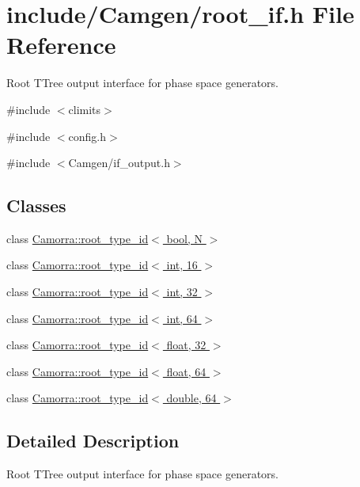 \hypertarget{a00592}{
\section{include/Camgen/root\_\-if.h File Reference}
\label{a00592}
}


Root TTree output interface for phase space generators.  


{\ttfamily \#include $<$climits$>$}\par
{\ttfamily \#include $<$config.h$>$}\par
{\ttfamily \#include $<$Camgen/if\_\-output.h$>$}\par
\subsection*{Classes}
\begin{DoxyCompactItemize}
\item 
class \hyperlink{a00432}{Camorra::root\_\-type\_\-id$<$ bool, N $>$}
\item 
class \hyperlink{a00436}{Camorra::root\_\-type\_\-id$<$ int, 16 $>$}
\item 
class \hyperlink{a00437}{Camorra::root\_\-type\_\-id$<$ int, 32 $>$}
\item 
class \hyperlink{a00438}{Camorra::root\_\-type\_\-id$<$ int, 64 $>$}
\item 
class \hyperlink{a00434}{Camorra::root\_\-type\_\-id$<$ float, 32 $>$}
\item 
class \hyperlink{a00435}{Camorra::root\_\-type\_\-id$<$ float, 64 $>$}
\item 
class \hyperlink{a00433}{Camorra::root\_\-type\_\-id$<$ double, 64 $>$}
\end{DoxyCompactItemize}


\subsection{Detailed Description}
Root TTree output interface for phase space generators. 